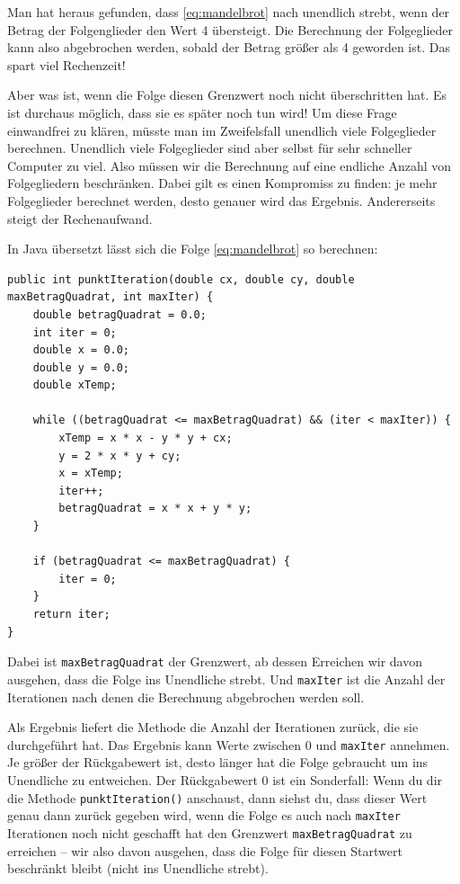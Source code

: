 Man hat heraus gefunden, dass \ref{eq:mandelbrot} nach unendlich strebt, wenn
der Betrag der Folgenglieder den Wert 4 übersteigt. Die Berechnung der
Folgeglieder kann also abgebrochen werden, sobald der Betrag größer als 4
geworden ist. Das spart viel Rechenzeit!

Aber was ist, wenn die Folge diesen Grenzwert noch nicht überschritten hat. Es
ist durchaus möglich, dass sie es später noch tun wird! Um diese Frage
einwandfrei zu klären, müsste man im Zweifelsfall unendlich viele Folgeglieder
berechnen. Unendlich viele Folgeglieder sind aber selbst für sehr schneller
Computer zu viel. Also müssen wir die Berechnung auf eine endliche Anzahl von
Folgegliedern beschränken. Dabei gilt es einen Kompromiss zu finden: je mehr
Folgeglieder berechnet werden, desto genauer wird das Ergebnis. Andererseits
steigt der Rechenaufwand.

In Java übersetzt lässt sich die Folge \ref{eq:mandelbrot} so berechnen:

\begin{lstlisting}
public int punktIteration(double cx, double cy, double maxBetragQuadrat, int maxIter) { 
    double betragQuadrat = 0.0;
    int iter = 0;
    double x = 0.0;
    double y = 0.0;
    double xTemp;

    while ((betragQuadrat <= maxBetragQuadrat) && (iter < maxIter)) {
        xTemp = x * x - y * y + cx;
        y = 2 * x * y + cy;
        x = xTemp;
        iter++;
        betragQuadrat = x * x + y * y;
    }

    if (betragQuadrat <= maxBetragQuadrat) {
        iter = 0;
    }
    return iter;
}
\end{lstlisting}

Dabei ist \lstinline|maxBetragQuadrat| der Grenzwert, ab dessen Erreichen wir
davon ausgehen, dass die Folge ins Unendliche strebt. Und \lstinline|maxIter|
ist die Anzahl der Iterationen nach denen die Berechnung abgebrochen werden
soll.

Als Ergebnis liefert die Methode die Anzahl der Iterationen zurück, die sie
durchgeführt hat. Das Ergebnis kann Werte zwischen 0 und \lstinline|maxIter|
annehmen. Je größer der Rückgabewert ist, desto länger hat die Folge gebraucht
um ins Unendliche zu entweichen. Der Rückgabewert 0 ist ein Sonderfall: Wenn du
dir die Methode \lstinline|punktIteration()| anschaust, dann siehst du, dass
dieser Wert genau dann zurück gegeben wird, wenn die Folge es auch nach
\lstinline|maxIter| Iterationen noch nicht geschafft hat den Grenzwert
\lstinline|maxBetragQuadrat| zu erreichen -- wir also davon ausgehen, dass die
Folge für diesen Startwert beschränkt bleibt (nicht ins Unendliche strebt).


